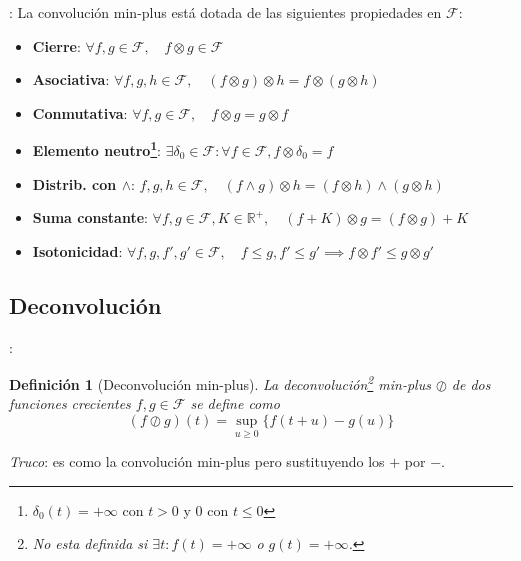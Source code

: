 \documentclass[xcolor={x11names}]{beamer}
\newtheorem{definicion}{Definición}[section]
\begin{document}
\begin{frame}{\secname: \subsecname}
    La convolución min-plus
    está dotada de las
    siguientes
    propiedades en $\mathcal{F}$:
    \begin{itemize}
        \item \textbf{Cierre}:
            $\forall f,g\in\mathcal{F},\quad f\otimes g\in\mathcal{F}$
        \pause
        \item \textbf{Asociativa}:
            $\forall f,g,h\in\mathcal{F},
            \quad 
            (f\otimes g)
            \otimes h
            =
            f\otimes
            (g\otimes h)$
        \pause
        \item \textbf{Conmutativa}:
            $\forall
            f,g\in\mathcal{F},
            \quad
            f\otimes g=
            g\otimes f$
        \pause
    \item \textbf{Elemento neutro\footnote{$\delta_0(t)=+\infty$ con $t>0$ y 0 con $t\leq0$}}:
            $\exists\delta_0\in\mathcal{F}: \forall f\in\mathcal{F},
            f\otimes\delta_0=f$
        \pause
    \item \textbf{Distrib. con $\land$}:
        $f,g,h\in\mathcal{F},
        \quad
        (f\land g)\otimes h
        = 
        (f\otimes h)
        \land
        (g\otimes h)$
    \pause
    \item \textbf{Suma constante}:
        $\forall f,g\in\mathcal{F},K\in\mathbb{R}^+,
        \quad
        (f+K)\otimes g
        =(f\otimes g) + K$

    \pause
    \item \textbf{Isotonicidad}:
        $\forall f,g,f',g'\in\mathcal{F},\quad
        f\leq g,f'\leq g'
        \implies
        f\otimes f'
        \leq
        g\otimes g'$
    \end{itemize}
\end{frame}


\subsection{Deconvolución}
\begin{frame}{\secname: \subsecname}
    \begin{definicion}[Deconvolución min-plus]
        La deconvolución\footnote{No
        esta definida si
        $\exists t: f(t)=+\infty
        $ o $g(t)=+\infty$.}
        min-plus
        $\oslash$ de dos
        funciones crecientes
        $f,g\in\mathcal{F}$
        se define como
        \begin{equation}
            (f\oslash g)(t)
            =\sup_{u\geq0}
            \{f(t+u)-g(u)\}
        \end{equation}
    \end{definicion}

    \vfill

    \emph{Truco}:
    es como la convolución
    min-plus pero sustituyendo
    los $+$ por $-$.
\end{frame}
\end{document}
